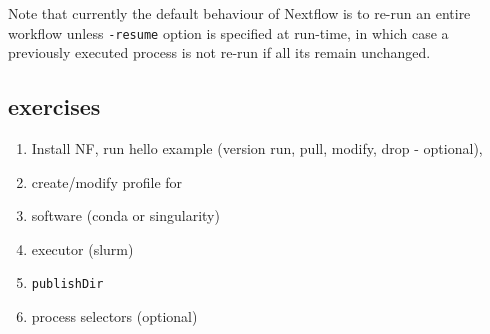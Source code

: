 \begin{note}
Note that currently the default behaviour of Nextflow is to re-run an entire workflow 
unless \texttt{-resume} option is specified at run-time, in which case a previously 
executed process is not re-run if all its remain unchanged.

\end{note}


\subsection{exercises}

\begin{enumerate}
 \item Install NF, run hello example (version run, pull, modify, drop - optional), 
 \item create/modify profile for 
  \item software (conda or singularity)
  \item executor (slurm)
 \item \texttt{publishDir}
 \item process selectors (optional)
\end{enumerate}


%
%
%
%
%
%
%
%
%

